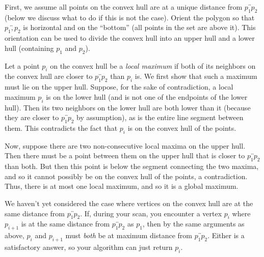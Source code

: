 \documentclass{article}
\newcounter{counter}
\newcommand{\oline}[1]{\overleftrightarrow{#1}}
\begin{document}
{\begin{enumerate}[label=(\alph*)]
    \vspace{3mm}
    First, we assume all points on the convex hull are at a unique distance from $\oline{p_1p_2}$ (below we discuss what to do if this is not the case). Orient the polygon so that $\oline{p_1,p_2}$ is horizontal and on the ``bottom'' (all points in the set are above it). This orientation can be used to divide the convex hull into an upper hull and a lower hull (containing $p_1$ and $p_2$). 

    \vspace{3mm}
    Let a point $p_i$ on the convex hull be a {\it local maximum} if both of its neighbors on the convex hull are closer to $\oline{p_1p_2}$ than $p_i$ is. We first show that such a maximum must lie on the upper hull. Suppose, for the sake of contradiction, a local maximum $p_i$ is on the lower hull (and is not one of the endpoints of the lower hull). Then its two neighbors on the
    lower hull are both lower than it (because they are closer to $\oline{p_1p_2}$ by assumption), as is the entire line segment between
    them. This contradicts the fact that $p_i$ is on the convex hull of the points. 

      \vspace{3mm}
      Now, suppose there are two non-consecutive local maxima on the upper hull. Then there must be a point between them on the upper hull that is closer to $\oline{p_1p_2}$ than both. But then this point is below the segment connecting the two maxima, and so it cannot possibly be on the convex hull of the points, a contradiction. 
      Thus, there is at most one local maximum, and so it is a global maximum. 

      \vspace{3mm}
      We haven't yet considered the case where vertices on the convex hull are at the same distance from $\oline{p_1p_2}$. If, during your scan, you encounter a vertex $p_i$ where $p_{i+1}$ is at the same distance from $\oline{p_1p_2}$ as $p_1$, then by the same arguments as above, $p_i$ and $p_{i+1}$ must {\it both} be at maximum distance from $\oline{p_1p_2}$. Either is a satisfactory answer, so your algorithm can just return $p_i$. 
      
      
      

\end{enumerate}}
\end{document}
